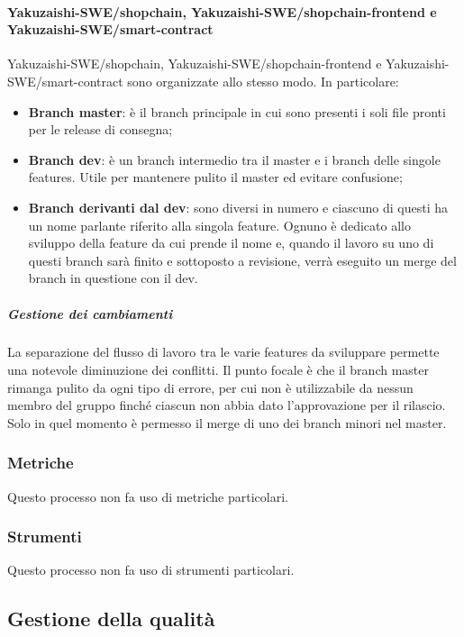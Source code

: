 \paragraph{Yakuzaishi-SWE/shopchain, Yakuzaishi-SWE/shopchain-frontend e
    \\ Yakuzaishi-SWE/smart-contract}
Yakuzaishi-SWE/shopchain, Yakuzaishi-SWE/shopchain-frontend{} e Yakuzaishi-SWE/smart-contract{} sono organizzate allo stesso modo. In particolare:
\begin{itemize}
    \item \textbf{Branch\glo{} master}: è il branch\glo{} principale in cui sono presenti i soli file pronti per le release di consegna;
    \item \textbf{Branch\glo{} dev}: è un branch\glo{} intermedio tra il master e i branch\glo{} delle singole features. Utile per mantenere pulito il master ed evitare confusione;
    \item \textbf{Branch\glo{} derivanti dal dev}: sono diversi in numero e ciascuno di questi ha un nome parlante riferito alla singola feature. Ognuno è dedicato allo sviluppo della feature da cui prende il nome e, quando il lavoro su uno di questi branch\glo{} sarà finito e sottoposto a revisione, verrà eseguito un merge\glo{} del branch\glo{} in questione con il dev.
\end{itemize}

\subparagraph{Gestione dei cambiamenti}
La separazione del flusso di lavoro tra le varie features da sviluppare permette una notevole diminuzione dei conflitti. Il punto focale è che il branch\glo{} master rimanga pulito da ogni tipo di errore, per cui non è utilizzabile da nessun membro del gruppo finché ciascun \roleProjectManagerLow{} non abbia dato l'approvazione per il rilascio. Solo in quel momento è permesso il merge\glo{} di uno dei branch\glo{} minori nel master.

\subsubsection{Metriche}
Questo processo non fa uso di metriche particolari.
\subsubsection{Strumenti}
Questo processo non fa uso di strumenti particolari.
\vspace{2cm}

\subsection{Gestione della qualità}\label{subsection: gestione_qualita}
